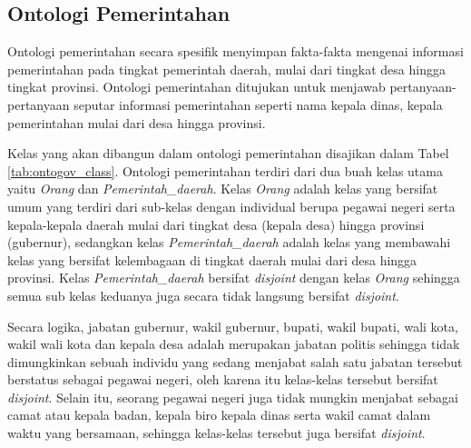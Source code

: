 \subsection{Ontologi Pemerintahan}
Ontologi pemerintahan secara spesifik menyimpan fakta-fakta mengenai informasi pemerintahan pada tingkat pemerintah daerah, mulai dari tingkat desa hingga tingkat provinsi. Ontologi pemerintahan ditujukan untuk menjawab pertanyaan-pertanyaan seputar informasi pemerintahan seperti nama kepala dinas, kepala pemerintahan mulai dari desa hingga provinsi.

Kelas yang akan dibangun dalam ontologi pemerintahan disajikan dalam Tabel \ref{tab:ontogov_class}. Ontologi pemerintahan terdiri dari dua buah kelas utama yaitu \emph{Orang} dan \emph{Pemerintah\_daerah}. Kelas \emph{Orang} adalah kelas yang bersifat umum yang terdiri dari sub-kelas dengan individual berupa pegawai negeri serta kepala-kepala daerah mulai dari tingkat desa (kepala desa) hingga provinsi (gubernur), sedangkan kelas \emph{Pemerintah\_daerah} adalah kelas yang membawahi kelas yang bersifat kelembagaan di tingkat daerah mulai dari desa hingga provinsi. Kelas \emph{Pemerintah\_daerah} bersifat \emph{disjoint} dengan kelas \emph{Orang} sehingga semua sub kelas keduanya juga secara tidak langsung bersifat \emph{disjoint}.

Secara logika, jabatan gubernur, wakil gubernur, bupati, wakil bupati, wali kota, wakil wali kota dan kepala desa adalah merupakan jabatan politis sehingga tidak dimungkinkan sebuah individu yang sedang menjabat salah satu jabatan tersebut berstatus sebagai pegawai negeri, oleh karena itu kelas-kelas tersebut bersifat \emph{disjoint}. Selain itu, seorang pegawai negeri juga tidak mungkin menjabat sebagai camat atau kepala badan, kepala biro kepala dinas serta wakil camat dalam waktu yang bersamaan, sehingga kelas-kelas tersebut juga bersifat \emph{disjoint}.

